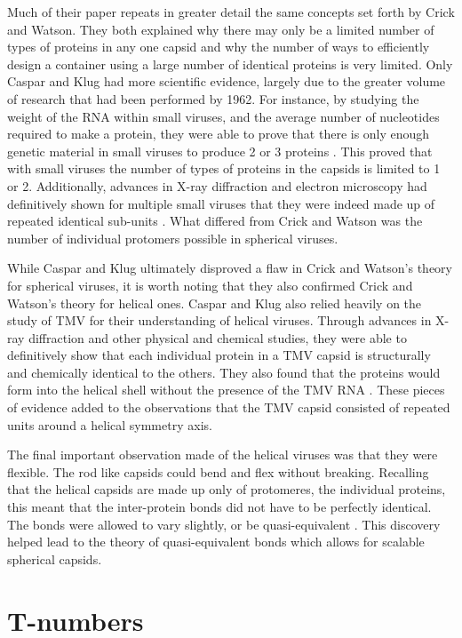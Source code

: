\documentclass[12pt,letter]{article}
\begin{document}
Much of their paper repeats in greater detail the same concepts set forth by Crick and Watson. They both explained why there may only be a limited number of types of proteins in any one capsid and why the number of ways to efficiently design a container using a large number of identical proteins is very limited. Only Caspar and Klug had more scientific evidence, largely due to the greater volume of research that had been performed by 1962. For instance, by studying the weight of the RNA within small viruses, and the average number of nucleotides required to make a protein, they were able to prove that there is only enough genetic material in small viruses to produce 2 or 3 proteins \cite[p 1]{Caspar:1962}. This proved that with small viruses the number of types of proteins in the capsids is limited to 1 or 2. Additionally, advances in X-ray diffraction and electron microscopy had definitively shown for multiple small viruses that they were indeed made up of repeated  identical sub-units \cite[p 2]{Caspar:1962}. What differed from Crick and Watson was the number of individual protomers possible in spherical viruses.

While Caspar and Klug ultimately disproved a flaw in Crick and Watson's theory for spherical viruses, it is worth noting that they also confirmed Crick and Watson's theory for helical ones. Caspar and Klug also relied heavily on the study of TMV for their understanding of helical viruses. Through advances in X-ray diffraction and other physical and chemical studies, they were able to definitively show that each individual protein in a TMV capsid is structurally and chemically identical to the others. They also found that the proteins would form into the helical shell without the presence of the TMV RNA \cite[p 4-5]{Caspar:1962}. These pieces of evidence added to the observations that the TMV capsid consisted of repeated units around a helical symmetry axis.

The final important observation made of the helical viruses was that they were flexible. The rod like capsids could bend and flex without breaking. Recalling that the helical capsids are made up only of protomeres, the individual proteins, this meant that the inter-protein bonds did not have to be perfectly identical. The bonds were allowed to vary slightly, or be quasi-equivalent \cite[p 7]{Caspar:1962}. This discovery helped lead to the theory of quasi-equivalent bonds which allows for scalable spherical capsids.



\section{T-numbers}
\end{document}
